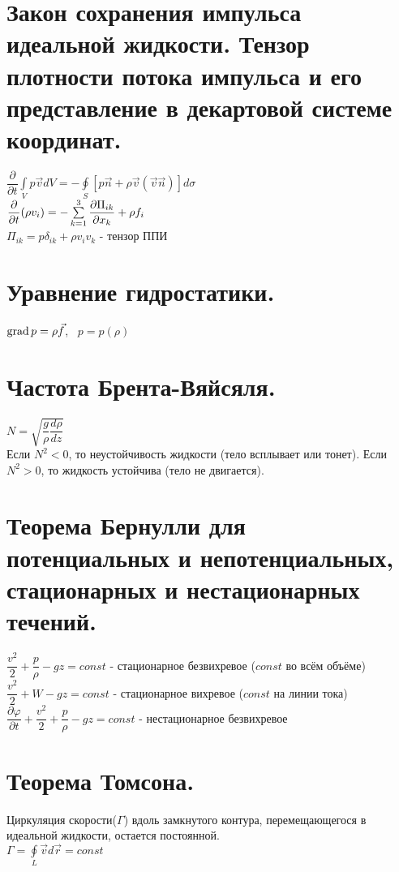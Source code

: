 \begin{multicols*}{2}
		\section{Закон сохранения импульса идеальной жидкости. Тензор плотности потока импульса и его представление в декартовой системе координат.}
		$ \dfrac{\partial}{\partial t}\int\limits_V p\vec{v}dV=-\oint\limits_S \left[p\vec{n}+\rho\vec{v}(\vec{v}\vec{n})\right]d\sigma$ \\
		$ \dfrac{\partial}{\partial t}(\rho v_i)=-\sum\limits_{k=1}^3\dfrac{\partial \Pi_{ik}}{\partial x_k}+\rho f_i $ \\
		$ \Pi_{ik} = p\delta_{ik}+\rho v_iv_k$ - тензор ППИ
		
		\section{Уравнение гидростатики.}
		$\operatorname{grad} p=\rho\vec{f}$,~
		$p=p(\rho)$
		
		\section{Частота Брента-Вяйсяля.}
		$N=\sqrt{\dfrac{g}{\rho}\dfrac{d\rho}{dz}}$\\
		Если $N^2<0$, то неустойчивость жидкости (тело всплывает или тонет). Если $N^2>0$, то жидкость устойчива (тело не двигается).
		
		\section{Теорема Бернулли для потенциальных и непотенциальных, стационарных и нестационарных течений.} 
		$\dfrac{v^2}{2}+\dfrac{p}{\rho}-gz=const$ - стационарное безвихревое ($const$ во всём объёме)\\
		$\dfrac{v^2}{2}+W-gz=const$ - стационарное вихревое ($const$ на линии тока)\\
		$\dfrac{\partial \varphi}{\partial t}+\dfrac{v^2}{2}+\dfrac{p}{\rho}-gz=const$ - нестационарное безвихревое \\
		
		\section{Теорема Томсона.}
		Циркуляция скорости($\Gamma$) вдоль замкнутого контура, перемещающегося в идеальной жидкости, остается постоянной. \\
		$\Gamma = \oint\limits_L\vec{v}d\vec{r}=const$
		

\end{multicols*}
